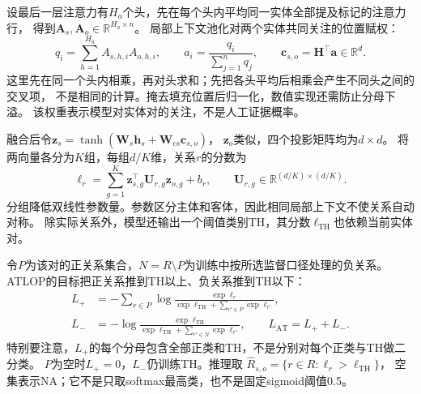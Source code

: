 设最后一层注意力有$H_{\!a}$个头，先在每个头内平均同一实体全部提及标记的注意力行，
得到$\bm{A}_s,\bm{A}_o\in\mathbb{R}^{H_{\!a}\times n}$。
局部上下文池化对两个实体共同关注的位置赋权：
\begin{equation}
  q_i=\sum_{h=1}^{H_{\!a}}A_{s,h,i}A_{o,h,i},
  \qquad a_i=\frac{q_i}{\sum_{j=1}^{n}q_j},
  \qquad \bm{c}_{s,o}=\bm{H}^{\top}\bm{a}\in\mathbb{R}^{d}.
  \label{eq:nlp-extraction-atlop-context}
\end{equation}
这里先在同一个头内相乘，再对头求和；先把各头平均后相乘会产生不同头之间的交叉项，
不是相同的计算。掩去填充位置后归一化，数值实现还需防止分母下溢。
该权重表示模型对实体对的关注，不是人工证据概率。

融合后令$\bm{z}_s=\tanh(\bm{W}_s\bm{h}_s+\bm{W}_{cs}\bm{c}_{s,o})$，
$\bm{z}_o$类似，四个投影矩阵均为$d\times d$。
将两向量各分为$K$组，每组$d/K$维，关系$r$的分数为
\begin{equation}
  \ell_r=\sum_{g=1}^{K}
  \bm{z}_{s,g}^{\top}\bm{U}_{r,g}\bm{z}_{o,g}+b_r,
  \qquad
  \bm{U}_{r,g}\in\mathbb{R}^{(d/K)\times(d/K)}.
  \label{eq:nlp-extraction-atlop-score}
\end{equation}
分组降低双线性参数量。参数区分主体和客体，因此相同局部上下文不使关系自动对称。
除实际关系外，模型还输出一个阈值类别TH，其分数$\ell_{\mathrm{TH}}$也依赖当前实体对。

令$P$为该对的正关系集合，$N=R\setminus P$为训练中按所选监督口径处理的负关系。
ATLOP的目标把正关系推到TH以上、负关系推到TH以下：
\begin{equation}
  \begin{aligned}
    L_{+}&=-\sum_{r\in P}
      \log\frac{\exp\ell_r}
      {\exp\ell_{\mathrm{TH}}+\sum_{r'\in P}\exp\ell_{r'}},\\
    L_{-}&=-\log\frac{\exp\ell_{\mathrm{TH}}}
      {\exp\ell_{\mathrm{TH}}+\sum_{r'\in N}\exp\ell_{r'}},
    \qquad L_{\mathrm{AT}}=L_{+}+L_{-}.
  \end{aligned}
  \label{eq:nlp-extraction-atlop-loss}
\end{equation}
特别要注意，$L_+$的每个分母包含全部正类和TH，不是分别对每个正类与TH做二分类。
$P$为空时$L_+=0$，$L_-$仍训练TH。推理取
$\widehat{R}_{s,o}=\{r\in R:\ell_r>\ell_{\mathrm{TH}}\}$，
空集表示NA；它不是只取softmax最高类，也不是固定sigmoid阈值0.5。

